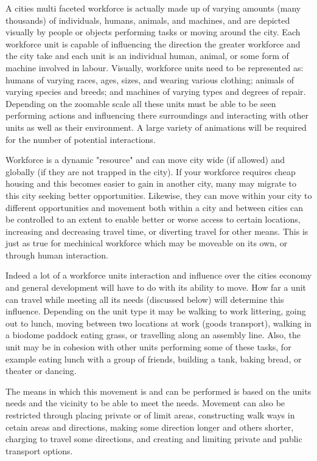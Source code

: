 A cities multi faceted workforce is actually made up of varying amounts (many thousands) of individuals, humans, animals, and machines, and are depicted visually by people or objects performing tasks or moving around the city. Each workforce unit is capable of influencing the direction the greater workforce and the city take and each unit is an individual human, animal, or some form of machine involved in labour. Visually, workforce units need to be represented as: humans of varying races, ages, sizes, and wearing various clothing; animals of varying species and breeds; and machines of varying types and degrees of repair. Depending on the zoomable scale all these units must be able to be seen performing actions and influencing there surroundings and interacting with other units as well as their environment. A large variety of animations will be required for the number of potential interactions. 

Workforce is a dynamic "resource" and can move city wide (if allowed) and globally (if they are not trapped in the city). If your workforce requires cheap housing and this becomes easier to gain in another city, many may migrate to this city seeking better opportunities. Likewise, they can move within your city to different opportunities and movement both within a city and between cities can be controlled to an extent to enable better or worse access to certain locations, increasing and decreasing travel time, or diverting travel for other means. This is just as true for mechinical workforce which may be moveable on its own, or through human interaction. 

Indeed a lot of a workforce units interaction and influence over the cities economy and general development will have to do with its ability to move. How far a unit can travel while meeting all its needs (discussed below) will determine this influence. Depending on the unit type it may be walking to work littering, going out to lunch, moving between two locations at work (goods transport), walking in a biodome paddock eating grass, or travelling along an assembly line. Also, the unit may be in cohesion with other units performing some of these tasks, for example eating lunch with a group of friends, building a tank, baking bread, or theater or dancing. 

The means in which this movement is and can be performed is based on the units needs and the vicinity to be able to meet the needs. Movement can also be restricted through placing private or of limit areas, constructing walk ways in cetain areas and directions, making some direction longer and others shorter, charging to travel some directions, and creating and limiting private and public transport options. 


